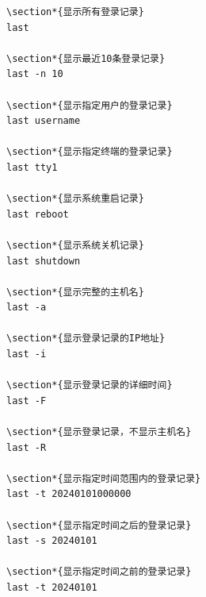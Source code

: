 \documentclass[12pt,UTF8]{ctexbook}
\begin{document}
\begin{verbatim}
\section*{显示所有登录记录}
last

\section*{显示最近10条登录记录}
last -n 10

\section*{显示指定用户的登录记录}
last username

\section*{显示指定终端的登录记录}
last tty1

\section*{显示系统重启记录}
last reboot

\section*{显示系统关机记录}
last shutdown

\section*{显示完整的主机名}
last -a

\section*{显示登录记录的IP地址}
last -i

\section*{显示登录记录的详细时间}
last -F

\section*{显示登录记录，不显示主机名}
last -R

\section*{显示指定时间范围内的登录记录}
last -t 20240101000000

\section*{显示指定时间之后的登录记录}
last -s 20240101

\section*{显示指定时间之前的登录记录}
last -t 20240101
\end{verbatim}
\end{document}
